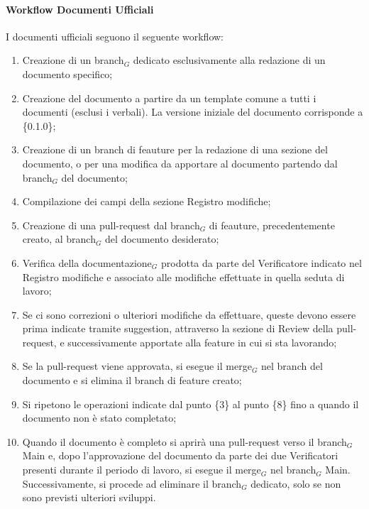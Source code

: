 \documentclass[10pt]{article}
\begin{document}
\begin{justify}
        \paragraph{Workflow Documenti Ufficiali}
        I documenti ufficiali seguono il seguente workflow:
        \begin{enumerate}
            \item Creazione di un branch$_G$ dedicato esclusivamente alla redazione di un documento specifico;
            \item Creazione del documento a partire da un template comune a tutti i documenti (esclusi i verbali). La versione iniziale del documento corrisponde a \{0.1.0\};
            \item Creazione di un branch di feauture per la redazione di una sezione del documento, o per una modifica da apportare al documento partendo dal branch$_G$ del documento;
            \item Compilazione dei campi della sezione Registro modifiche;
            \item Creazione di una pull-request dal branch$_G$ di feauture, precedentemente creato, al branch$_G$ del documento desiderato;
            \item Verifica della documentazione$_G$ prodotta da parte del Verificatore indicato nel Registro modifiche e associato alle modifiche effettuate in quella seduta di lavoro;
            \item Se ci sono correzioni o ulteriori modifiche da effettuare, queste devono essere prima indicate tramite suggestion, attraverso la sezione di Review della pull-request, e successivamente apportate alla feature in cui si sta lavorando;
            \item Se la pull-request viene approvata, si esegue il merge$_G$ nel branch del documento e si elimina il branch di feature creato;
            \item Si ripetono le operazioni indicate dal punto \{3\} al punto \{8\} fino a quando il documento non è stato completato;
            \item Quando il documento è completo si aprirà una pull-request verso il branch$_G$ Main e, dopo l'approvazione del documento da parte dei due Verificatori presenti durante il periodo di lavoro, si esegue il merge$_G$ nel branch$_G$ Main. Successivamente, si procede ad eliminare il branch$_G$ dedicato, solo se non sono previsti ulteriori sviluppi.
        \end{enumerate}


\end{justify}
\end{document}

